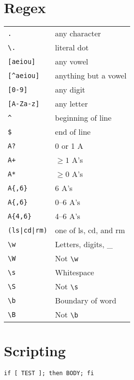 \documentclass[a4paper, twocolumn]{article}
\renewcommand{\tt}{\texttt}
\begin{document}
\section{Regex}
\begin{tabular}{ll}
    \verb|.|            & any character                             \\
    \verb|\.|           & literal dot                               \\
    \verb|[aeiou]|      & any vowel                                 \\
    \verb|[^aeiou]|     & anything but a vowel                      \\
    \verb|[0-9]|        & any digit                                 \\
    \verb|[A-Za-z]|     & any letter                                \\
    \verb|^|            & beginning of line                         \\
    \verb|$|            & end of line                               \\
    \verb|A?|           & 0 or 1 A                                  \\
    \verb|A+|           & $\ge 1$ A's                               \\
    \verb|A*|           & $\ge 0$ A's                               \\
    \verb|A{,6}|        & 6 A's                                     \\
    \verb|A{,6}|        & 0--6 A's                                  \\
    \verb|A{4,6}|       & 4--6 A's                                  \\
    \verb!(ls|cd|rm)!   & one of ls, cd, and rm                     \\
    \verb|\w|           & Letters, digits, \_                       \\
    \verb|\W|           & Not \verb|\w|                             \\
    \verb|\s|           & Whitespace                                \\
    \verb|\S|           & Not \verb|\s|                             \\
    \verb|\b|           & Boundary of word                          \\
    \verb|\B|           & Not \verb|\b|
\end{tabular}

\section{Scripting}
\tt{if [ TEST ]; then BODY; fi}
\vspace{0.3cm}
\end{document}
